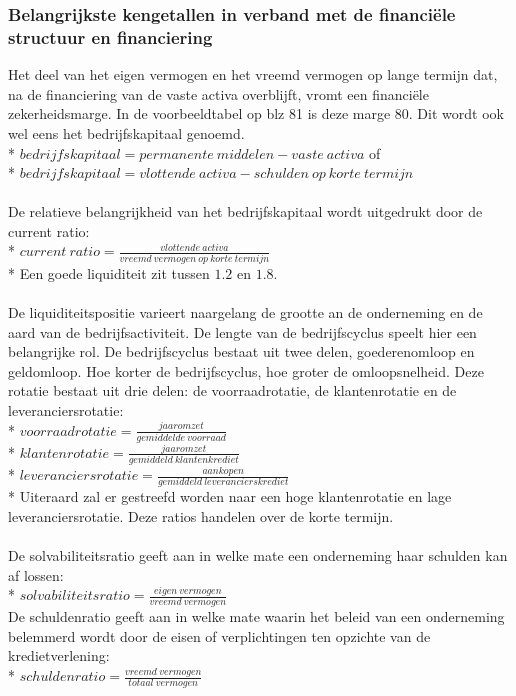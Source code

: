 \documentclass[12pt]{article}
\begin{document}
\subsubsection{Belangrijkste kengetallen in verband met de financi\"ele structuur en financiering}
Het deel van het eigen vermogen en het vreemd vermogen op lange termijn dat, na de financiering van de vaste activa overblijft, vromt een financi\"ele zekerheidsmarge. In de voorbeeldtabel op blz 81 is deze marge 80. Dit wordt ook wel eens het bedrijfskapitaal genoemd.\\*
$bedrijfskapitaal = permanente\ middelen - vaste\ activa$ of\\*
$bedrijfskapitaal = vlottende\ activa - schulden\ op\ korte\ termijn$\\\\
De relatieve belangrijkheid van het bedrijfskapitaal wordt uitgedrukt door de current ratio:\\*
$current\ ratio = \frac{vlottende\ activa}{vreemd\ vermogen\ op\ korte\ termijn}$\\*
Een goede liquiditeit zit tussen $1.2$ en $1.8$.\\\\
De liquiditeitspositie varieert naargelang de grootte an de onderneming en  de aard van de bedrijfsactiviteit. De lengte van de bedrijfscyclus speelt hier een belangrijke rol. De bedrijfscyclus bestaat uit twee delen, goederenomloop en geldomloop. Hoe korter de bedrijfscyclus, hoe groter de omloopsnelheid. Deze rotatie bestaat uit drie delen: de voorraadrotatie, de klantenrotatie en de leveranciersrotatie:\\*
$voorraadrotatie = \frac{jaaromzet}{gemiddelde\ voorraad}$\\*
$klantenrotatie = \frac{jaaromzet}{gemiddeld\ klantenkrediet}$\\*
$leveranciersrotatie = \frac{aankopen}{gemiddeld\ leverancierskrediet}$\\*
Uiteraard zal er gestreefd worden naar een hoge klantenrotatie en lage leveranciersrotatie. Deze ratios handelen over de korte termijn.\\\\
De solvabiliteitsratio geeft aan in welke mate een onderneming haar schulden kan af lossen:\\*
$solvabiliteitsratio = \frac{eigen\ vermogen}{vreemd\ vermogen}$\\
De schuldenratio geeft aan in welke mate waarin het beleid van een onderneming belemmerd wordt door de eisen of verplichtingen ten opzichte van de kredietverlening:\\*
$schuldenratio = \frac{vreemd\ vermogen}{totaal\ vermogen}$
\end{document}
